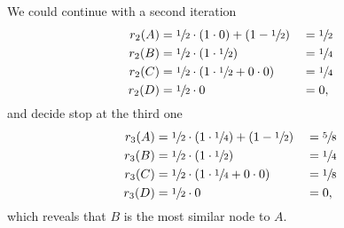 We could continue with a second iteration
%
\begin{alignat*}{3}
  r_2(A) &= \sfrac{1}{2} \cdot (1\cdot0) + (1-\sfrac{1}{2}) &&= \sfrac{1}{2} \\
  r_2(B) &= \sfrac{1}{2} \cdot (1\cdot\sfrac{1}{2})         &&= \sfrac{1}{4} \\
  r_2(C) &= \sfrac{1}{2} \cdot (1\cdot\sfrac{1}{2}+0\cdot0) &&= \sfrac{1}{4} \\
  r_2(D) &= \sfrac{1}{2} \cdot 0                            && = 0, 
\end{alignat*}
%
and decide stop at the third one
%
\begin{alignat*}{3}
  r_3(A) &= \sfrac{1}{2} \cdot (1\cdot\sfrac{1}{4}) + (1-\sfrac{1}{2}) &&= \sfrac{5}{8} \\
  r_3(B) &= \sfrac{1}{2} \cdot (1\cdot\sfrac{1}{2})                    &&= \sfrac{1}{4} \\
  r_3(C) &= \sfrac{1}{2} \cdot (1\cdot\sfrac{1}{4}+0\cdot0)            &&= \sfrac{1}{8} \\
  r_3(D) &= \sfrac{1}{2} \cdot 0                                       &&= 0,
\end{alignat*}
%
which reveals that $B$ is the most similar node to $A$.